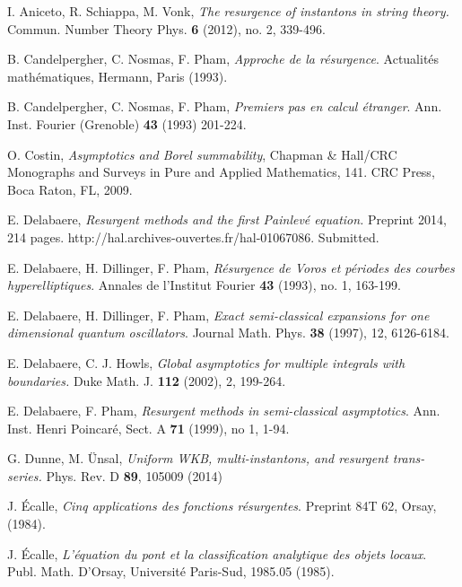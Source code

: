 \documentclass[11pt, english]{smfart}
\theoremstyle{definition}
\begin{document}
\begin{thebibliography}{BKM}

 I. Aniceto, R. Schiappa, M. Vonk, 
\textit{The resurgence of instantons in string theory.}
Commun. Number Theory Phys. \textbf{6} (2012), no. 2, 339-496. 

 B. Candelpergher, C. Nosmas, F. Pham, \textit{Approche de la
    r\'esurgence}. Actualit\'es math\'ematiques,  Hermann, Paris
    (1993).

 B. Candelpergher, C. Nosmas, F. Pham, \textit{Premiers
    pas en calcul \'etranger}. Ann. Inst. Fourier 
  (Grenoble) \textbf{43} (1993) 201-224.

 O.  Costin,  \textit{ Asymptotics and Borel
    summability}, 
Chapman \& Hall/CRC Monographs and Surveys in Pure and Applied
Mathematics,  141. CRC Press, Boca Raton, FL, 2009. 

 E. Delabaere, \textit{Resurgent methods and the first
    Painlev\'e equation.} Preprint 2014, 214 pages.
http://hal.archives-ouvertes.fr/hal-01067086. Submitted.

 E. Delabaere, H. Dillinger, F. Pham, \textit{ R\'esurgence de
    Voros et p\'eriodes des courbes hyperelliptiques}.
Annales de l'Institut Fourier \textbf{43} (1993), no. 1, 163-199.

 E. Delabaere, H. Dillinger, F. Pham, \textit{ Exact semi-classical
    expansions for one dimensional quantum oscillators}.
Journal Math. Phys. \textbf{38}  (1997), 12,  6126-6184.

 E. Delabaere, C. J. Howls, \textit{ 
Global asymptotics for multiple integrals with boundaries.}
Duke Math. J. \textbf{112} (2002),  2, 199-264.

 E. Delabaere, F. Pham, \textit{ Resurgent methods in
    semi-classical asymptotics}. Ann. Inst. Henri
    Poincar\'e, Sect. A  \textbf{71}  (1999), no 1, 1-94.

 G. Dunne, M. \"Unsal, 
\textit{Uniform WKB, multi-instantons, and resurgent trans-series.}
Phys. Rev. D \textbf{89}, 105009 (2014)

 J. \'Ecalle, \textit{Cinq applications des fonctions
  r\'esurgentes}. Preprint 84T 62, Orsay,  (1984).

 J. \'Ecalle, \textit{L'\'equation du pont et la
  classification analytique des objets locaux}.
  Publ. Math. D'Orsay, Universit\'e Paris-Sud, 1985.05 (1985).


\end{thebibliography}
\end{document}
